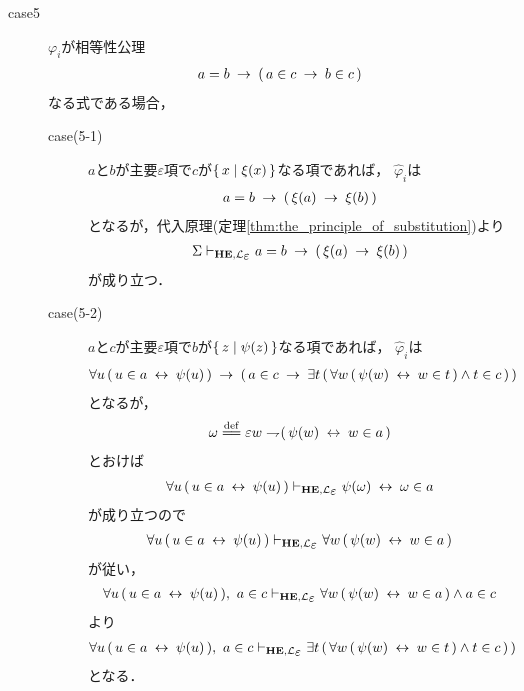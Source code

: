 \begin{metaprf}
\begin{description}
			\item[case5] $\varphi_{i}$が相等性公理
				\begin{align}
					a = b \hspace{0.25em}\rightarrow\hspace{0.25em} (\, a \in c \hspace{0.25em}\rightarrow\hspace{0.25em} b \in c\, )
				\end{align}
				なる式である場合，
				
				\begin{description}
					\item[case(5-1)] $a$と$b$が主要$\varepsilon$項で$c$が$\{\, x \mid \xi(x)\, \}$なる項であれば，
						$\widehat{\varphi}_{i}$は
						\begin{align}
							a = b \hspace{0.25em}\rightarrow\hspace{0.25em} (\, \xi(a) \hspace{0.25em}\rightarrow\hspace{0.25em} \xi(b)\, )
						\end{align}
						となるが，代入原理(定理\ref{thm:the_principle_of_substitution})より
						\begin{align}
							\Sigma \provable{\mbox{{\bf HE}},\lang{\varepsilon}} a = b \rarrow (\, \xi(a) \rarrow \xi(b)\, )
						\end{align}
						が成り立つ．
						
					\item[case(5-2)] $a$と$c$が主要$\varepsilon$項で$b$が$\{\, z \mid \psi(z)\, \}$なる項であれば，
						$\widehat{\varphi}_{i}$は
						\begin{align}
							\forall u\, (\, u \in a \hspace{0.25em}\leftrightarrow\hspace{0.25em} \psi(u)\, ) 
							\hspace{0.25em}\rightarrow\hspace{0.25em} (\, a \in c 
							\hspace{0.25em}\rightarrow\hspace{0.25em} \exists t\, (\, \forall w\, (\, \psi(w) \hspace{0.25em}\leftrightarrow\hspace{0.25em} w \in t\, ) \wedge t \in c\, )\, )
						\end{align}
						となるが，
						\begin{align}
							\omega \defeq \varepsilon w \negation (\, \psi(w) \lrarrow w \in a\, )
						\end{align}
						とおけば
						\begin{align}
							\forall u\, (\, u \in a \lrarrow \psi(u)\, )
							\provable{\mbox{{\bf HE}},\lang{\varepsilon}} \psi(\omega) \lrarrow \omega \in a 
						\end{align}
						が成り立つので
						\begin{align}
							\forall u\, (\, u \in a \lrarrow \psi(u)\, )
							\provable{\mbox{{\bf HE}},\lang{\varepsilon}} \forall w\, (\, \psi(w) \lrarrow w \in a\, )
						\end{align}
						が従い，
						\begin{align}
							\forall u\, (\, u \in a \lrarrow \psi(u)\, ),\ a \in c
							\provable{\mbox{{\bf HE}},\lang{\varepsilon}} \forall w\, (\, \psi(w) \lrarrow w \in a\, ) \wedge a \in c
						\end{align}
						より
						\begin{align}
							\forall u\, (\, u \in a \lrarrow \psi(u)\, ),\ a \in c
							\provable{\mbox{{\bf HE}},\lang{\varepsilon}} \exists t\, (\, \forall w\, (\, \psi(w) \lrarrow w \in t\, ) \wedge t \in c\, )\, )
						\end{align}
						となる．
						

\end{description}
\end{description}
\end{metaprf}
